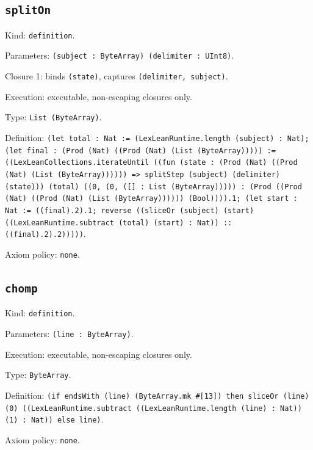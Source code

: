 \documentclass[11pt]{article}
\begin{document}
\subsection*{\texttt{splitOn}}
\noindent Kind: \texttt{definition}.\par
\noindent Parameters: \texttt{(subject : ByteArray) (delimiter : UInt8)}.\par
\noindent Closure 1: binds \texttt{(state)}, captures \texttt{(delimiter, subject)}.\par
\noindent Execution: executable, non-escaping closures only.\par
\noindent Type: \texttt{List (ByteArray)}.\par
\noindent Definition: \texttt{(let total : Nat := (LexLeanRuntime.length (subject) : Nat); (let final : (Prod (Nat) ((Prod (Nat) (List (ByteArray))))) := ((LexLeanCollections.iterateUntil ((fun (state : (Prod (Nat) ((Prod (Nat) (List (ByteArray)))))) => splitStep (subject) (delimiter) (state))) (total) ((0, (0, ([] : List (ByteArray))))) : (Prod ((Prod (Nat) ((Prod (Nat) (List (ByteArray)))))) (Bool)))).1; (let start : Nat := ((final).2).1; reverse ((sliceOr (subject) (start) ((LexLeanRuntime.subtract (total) (start) : Nat)) :: ((final).2).2)))))}.\par
\noindent Axiom policy: \texttt{none}.\par
\subsection*{\texttt{chomp}}
\noindent Kind: \texttt{definition}.\par
\noindent Parameters: \texttt{(line : ByteArray)}.\par
\noindent Execution: executable, non-escaping closures only.\par
\noindent Type: \texttt{ByteArray}.\par
\noindent Definition: \texttt{(if endsWith (line) (ByteArray.mk \#[13]) then sliceOr (line) (0) ((LexLeanRuntime.subtract ((LexLeanRuntime.length (line) : Nat)) (1) : Nat)) else line)}.\par
\noindent Axiom policy: \texttt{none}.\par
\end{document}
